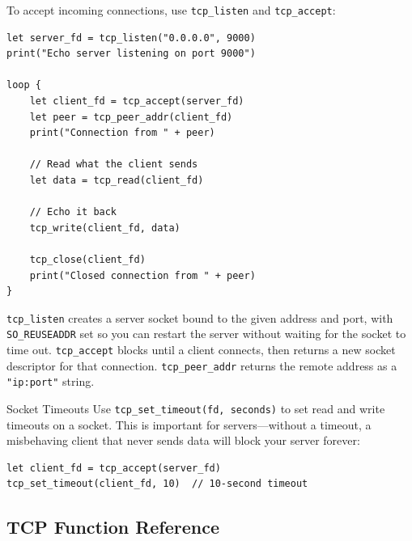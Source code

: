 To accept incoming connections, use \lstinline|tcp_listen| and
\lstinline|tcp_accept|:

\begin{lstlisting}[language=Lattice, caption={A minimal TCP echo server}]
let server_fd = tcp_listen("0.0.0.0", 9000)
print("Echo server listening on port 9000")

loop {
    let client_fd = tcp_accept(server_fd)
    let peer = tcp_peer_addr(client_fd)
    print("Connection from " + peer)

    // Read what the client sends
    let data = tcp_read(client_fd)

    // Echo it back
    tcp_write(client_fd, data)

    tcp_close(client_fd)
    print("Closed connection from " + peer)
}
\end{lstlisting}

\lstinline|tcp_listen| creates a server socket bound to the given address and
port, with \texttt{SO\_REUSEADDR} set so you can restart the server without
waiting for the socket to time out. \lstinline|tcp_accept| blocks until a
client connects, then returns a new socket descriptor for that connection.
\lstinline|tcp_peer_addr| returns the remote address as a
\lstinline|"ip:port"| string.

\begin{notebox}{Socket Timeouts}
Use \lstinline|tcp_set_timeout(fd, seconds)| to set read and write timeouts
on a socket. This is important for servers---without a timeout, a
misbehaving client that never sends data will block your server forever:
\begin{lstlisting}[language=Lattice]
let client_fd = tcp_accept(server_fd)
tcp_set_timeout(client_fd, 10)  // 10-second timeout
\end{lstlisting}
\end{notebox}

\subsection{TCP Function Reference}\label{sec:tcp-reference}

